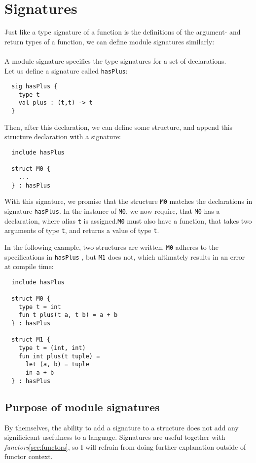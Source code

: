 \section{Signatures}
Just like a type signature of a function is the definitions of the argument- and
return types of a function, we can define module signatures similarly:\\\\
A module signature specifies the type signatures for a set of declarations.\\
Let us define a signature called \texttt{hasPlus}:
\begin{lstlisting}
  sig hasPlus {
    type t
    val plus : (t,t) -> t
  }
\end{lstlisting}

Then, after this declaration, we can define some structure, and append this
structure declaration with a signature:
\begin{lstlisting}
  include hasPlus
  
  struct M0 {
    ...
  } : hasPlus
\end{lstlisting}
With this signature, we promise that the structure \texttt{M0} matches the declarations
in signature \texttt{hasPlus}.
In the instance of \texttt{M0}, we now require, that \texttt{M0} has a
declaration, where alias \texttt{t} is assigned.\texttt{M0} must also have a
function, that takes two arguments of type \texttt{t}, and returns a value of
type \texttt{t}.

In the following example, two structures are written. \texttt{M0} adheres to the
specifications in \texttt{hasPlus} , but \texttt{M1} does not, which ultimately results in an
error at compile time:

\begin{lstlisting}
  include hasPlus
  
  struct M0 {
    type t = int
    fun t plus(t a, t b) = a + b
  } : hasPlus
  
  struct M1 {
    type t = (int, int)
    fun int plus(t tuple) =
      let (a, b) = tuple
      in a + b
  } : hasPlus
\end{lstlisting}
\subsection{Purpose of module signatures}
By themselves, the ability to add a signature to a structure does not add any
significicant usefulness to a language. Signatures are useful together with
\textit{functors}\ref{sec:functors}, so I will refrain from doing further
explanation outside of functor context.



